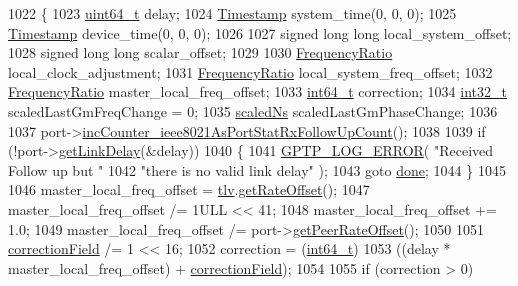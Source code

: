 \begin{DoxyCode}
1022 \{
1023     \hyperlink{parse_8c_aec6fcb673ff035718c238c8c9d544c47}{uint64\_t} delay;
1024     \hyperlink{class_timestamp}{Timestamp} system\_time(0, 0, 0);
1025     \hyperlink{class_timestamp}{Timestamp} device\_time(0, 0, 0);
1026 
1027     \textcolor{keywordtype}{signed} \textcolor{keywordtype}{long} \textcolor{keywordtype}{long} local\_system\_offset;
1028     \textcolor{keywordtype}{signed} \textcolor{keywordtype}{long} \textcolor{keywordtype}{long} scalar\_offset;
1029 
1030     \hyperlink{ptptypes_8hpp_a84de47dc2ed889ecd2b61706d3ad0f2e}{FrequencyRatio} local\_clock\_adjustment;
1031     \hyperlink{ptptypes_8hpp_a84de47dc2ed889ecd2b61706d3ad0f2e}{FrequencyRatio} local\_system\_freq\_offset;
1032     \hyperlink{ptptypes_8hpp_a84de47dc2ed889ecd2b61706d3ad0f2e}{FrequencyRatio} master\_local\_freq\_offset;
1033     \hyperlink{parse_8c_a67a9885ef4908cb72ce26d75b694386c}{int64\_t} correction;
1034     \hyperlink{parse_8c_a37994e3b11c72957c6f454c6ec96d43d}{int32\_t} scaledLastGmFreqChange = 0;
1035     \hyperlink{classscaled_ns}{scaledNs} scaledLastGmPhaseChange;
1036 
1037     port->\hyperlink{class_common_port_acfa4a67632219499ba332b29dad2235c}{incCounter\_ieee8021AsPortStatRxFollowUpCount}();
1038 
1039     \textcolor{keywordflow}{if} (!port->\hyperlink{class_common_port_a62887d159222a2b222fb9cf7c97a3218}{getLinkDelay}(&delay))
1040     \{
1041         \hyperlink{gptp__log_8hpp_afefbb1009717c128012bfeed94842987}{GPTP\_LOG\_ERROR}( \textcolor{stringliteral}{"Received Follow up but "}
1042                 \textcolor{stringliteral}{"there is no valid link delay"} );
1043         \textcolor{keywordflow}{goto} \hyperlink{mrp_validate_8c_a5992b274cfdcacdbc1fa8347fd01ebde}{done};
1044     \}
1045 
1046     master\_local\_freq\_offset = \hyperlink{class_p_t_p_message_follow_up_adb3aa00a5c7072f30af7374ea54c158c}{tlv}.\hyperlink{class_follow_up_t_l_v_a2a33a47008ba66b8d4c85265f0b825d3}{getRateOffset}();
1047     master\_local\_freq\_offset /= 1ULL << 41;
1048     master\_local\_freq\_offset += 1.0;
1049     master\_local\_freq\_offset /= port->\hyperlink{class_common_port_afc63c3fbddbf777d6e2792f1d27e35e2}{getPeerRateOffset}();
1050 
1051     \hyperlink{class_p_t_p_message_common_a635b707dac6610b5b159be5c8ec1891e}{correctionField} /= 1 << 16;
1052     correction = (\hyperlink{parse_8c_a67a9885ef4908cb72ce26d75b694386c}{int64\_t})
1053         ((delay * master\_local\_freq\_offset) + \hyperlink{class_p_t_p_message_common_a635b707dac6610b5b159be5c8ec1891e}{correctionField});
1054 
1055     \textcolor{keywordflow}{if} (correction > 0)

\end{DoxyCode}
